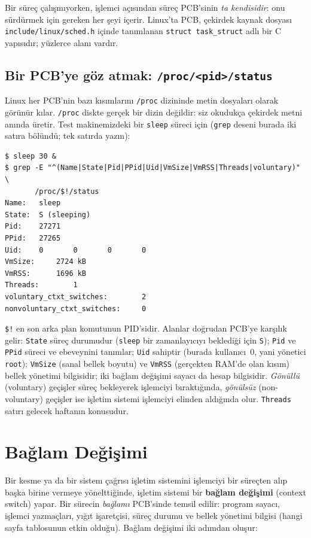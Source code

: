 \documentclass[11pt,a4paper]{article}
\newcommand{\term}[1]{\textbf{\color{mintdeep}#1}}
\newcommand{\cmd}[1]{\texttt{#1}}
\begin{document}
Bir süreç çalışmıyorken, işlemci açısından süreç PCB'sinin \emph{ta kendisidir}: onu sürdürmek için gereken her şeyi içerir. Linux'ta PCB, çekirdek kaynak dosyası \texttt{include/linux/sched.h} içinde tanımlanan \texttt{struct task\_struct} adlı bir C yapısıdır; yüzlerce alanı vardır.

\subsection{Bir PCB'ye göz atmak: \texttt{/proc/<pid>/status}}

Linux her PCB'nin bazı kısımlarını \texttt{/proc} dizininde metin dosyaları olarak görünür kılar. \texttt{/proc} diskte gerçek bir dizin değildir: siz okudukça çekirdek metni anında üretir. Test makinemizdeki bir \cmd{sleep} süreci için (\cmd{grep} deseni burada iki satıra bölündü; tek satırda yazın):

\begin{lstlisting}[style=term]
$ sleep 30 &
$ grep -E "^(Name|State|Pid|PPid|Uid|VmSize|VmRSS|Threads|voluntary)" \
       /proc/$!/status
Name:   sleep
State:  S (sleeping)
Pid:    27271
PPid:   27265
Uid:    0       0       0       0
VmSize:     2724 kB
VmRSS:      1696 kB
Threads:        1
voluntary_ctxt_switches:        2
nonvoluntary_ctxt_switches:     0
\end{lstlisting}

\verb|$!| en son arka plan komutunun PID'sidir. Alanlar doğrudan PCB'ye karşılık gelir: \texttt{State} süreç durumudur (\cmd{sleep} bir zamanlayıcıyı beklediği için \texttt{S}); \texttt{Pid} ve \texttt{PPid} süreci ve ebeveynini tanımlar; \texttt{Uid} sahiptir (burada kullanıcı~$0$, yani yönetici \texttt{root}); \texttt{VmSize} (sanal bellek boyutu) ve \texttt{VmRSS} (gerçekten RAM'de olan kısım) bellek yönetimi bilgisidir; iki bağlam değişimi sayacı da hesap bilgisidir. \emph{Gönüllü} (voluntary) geçişler süreç bekleyerek işlemciyi bıraktığında, \emph{gönülsüz} (non-voluntary) geçişler ise işletim sistemi işlemciyi elinden aldığında olur. \texttt{Threads} satırı gelecek haftanın konusudur.

\section{Bağlam Değişimi}
\label{sec:ctx}

Bir kesme ya da bir sistem çağrısı işletim sistemini işlemciyi bir süreçten alıp başka birine vermeye yönelttiğinde, işletim sistemi bir \term{bağlam değişimi} (context switch) yapar. Bir sürecin \emph{bağlamı} PCB'sinde temsil edilir: program sayacı, işlemci yazmaçları, yığıt işaretçisi, süreç durumu ve bellek yönetimi bilgisi (hangi sayfa tablosunun etkin olduğu). Bağlam değişimi iki adımdan oluşur:
\end{document}
